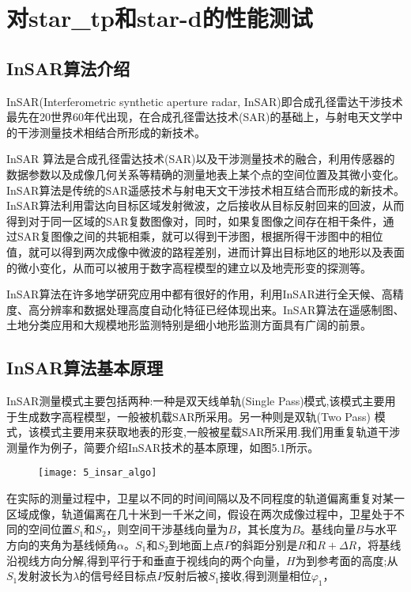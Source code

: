 
\chapter{对star\_tp和star-d的性能测试}
\label{chap:InSAR5}

\section{InSAR算法介绍}

InSAR\citep{wu2008insar}(Interferometric synthetic aperture radar, InSAR)即合成孔径雷达干涉技术最先在20世界60年代出现，在合成孔径雷达技术(SAR)的基础上，与射电天文学中的干涉测量技术相结合所形成的新技术。

InSAR 算法是合成孔径雷达技术(SAR)以及干涉测量技术的融合，利用传感器的数据参数以及成像几何关系等精确的测量地表上某个点的空间位置及其微小变化。InSAR算法是传统的SAR遥感技术与射电天文干涉技术相互结合而形成的新技术。InSAR算法利用雷达向目标区域发射微波，之后接收从目标反射回来的回波，从而得到对于同一区域的SAR复数图像对，同时，如果复图像之间存在相干条件，通过SAR复图像之间的共轭相乘，就可以得到干涉图，根据所得干涉图中的相位值，就可以得到两次成像中微波的路程差别，进而计算出目标地区的地形以及表面的微小变化，从而可以被用于数字高程模型的建立以及地壳形变的探测等。

InSAR算法在许多地学研究应用中都有很好的作用，利用InSAR进行全天候、高精度、高分辨率和数据处理高度自动化特征已经体现出来。InSAR算法在遥感制图、土地分类应用和大规模地形监测特别是细小地形监测方面具有广阔的前景。 

\section{InSAR算法基本原理}

InSAR测量模式主要包括两种:一种是双天线单轨(Single Pass)模式,该模式主要用于生成数字高程模型，一般被机载SAR所采用。另一种则是双轨(Two Pass) 模式，该模式主要用来获取地表的形变,一般被星载SAR所采用.我们用重复轨道干涉测量作为例子，简要介绍InSAR技术的基本原理，如图5.1所示。

\begin{figure}[!htbp]
    \centering
    \texttt{[image: 5\_insar\_algo]}
    \label{fig:5_insar_algo}
\end{figure}
 
在实际的测量过程中，卫星以不同的时间间隔以及不同程度的轨道偏离重复对某一区域成像，轨道偏离在几十米到一千米之间，假设在两次成像过程中，卫星处于不同的空间位置$S_1$和$S_2$，则空间干涉基线向量为$B$，其长度为$B$。基线向量$B$与水平方向的夹角为基线倾角$\alpha$。$S_1$和$S_2$到地面上点$P$的斜距分别是$R$和$R+\Delta R$，将基线沿视线方向分解,得到平行于和垂直于视线向的两个向量，$H$为到参考面的高度;从$S_1$发射波长为$\lambda$的信号经目标点$P$反射后被$S_1$接收,得到测量相位$\varphi_1$，

